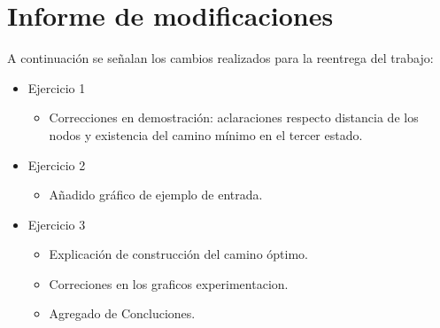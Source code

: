 \section*{Informe de modificaciones}

A continuación se señalan los cambios realizados para la reentrega del trabajo:

\begin{itemize}
	\item{
		Ejercicio 1
		\begin{itemize}
			\item{Correcciones en demostración: aclaraciones respecto distancia
				de los nodos y existencia del camino mínimo en el tercer estado.}
		\end{itemize}
	}
	\item{
		Ejercicio 2
		\begin{itemize}
			\item{Añadido gráfico de ejemplo de entrada.}
		\end{itemize}
	}
	\item{
		Ejercicio 3
		\begin{itemize}
			\item{Explicación de construcción del camino óptimo.}
			\item{Correciones en los graficos experimentacion.}
			\item{Agregado de Concluciones.}
		\end{itemize}
	}
\end{itemize}
